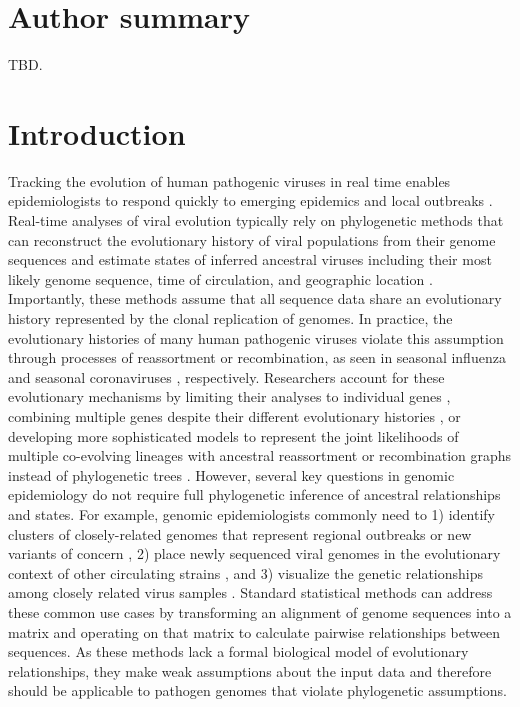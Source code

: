 \documentclass[10pt,letterpaper]{article}
\begin{document}
\section*{Author summary}
TBD.

\linenumbers

\section*{Introduction}

Tracking the evolution of human pathogenic viruses in real time enables epidemiologists to respond quickly to emerging epidemics and local outbreaks \cite{Grubaugh2019}.
Real-time analyses of viral evolution typically rely on phylogenetic methods that can reconstruct the evolutionary history of viral populations from their genome sequences and estimate states of inferred ancestral viruses including their most likely genome sequence, time of circulation, and geographic location \cite{Volz2013,Baele2017,Sagulenko2018}.
Importantly, these methods assume that all sequence data share an evolutionary history represented by the clonal replication of genomes.
In practice, the evolutionary histories of many human pathogenic viruses violate this assumption through processes of reassortment or recombination, as seen in seasonal influenza \cite{Nelson2008,Marshall2013} and seasonal coronaviruses \cite{Su2016}, respectively.
Researchers account for these evolutionary mechanisms by limiting their analyses to individual genes \cite{Lemey2007,Bhatt2011}, combining multiple genes despite their different evolutionary histories \cite{Wiens1998}, or developing more sophisticated models to represent the joint likelihoods of multiple co-evolving lineages with ancestral reassortment or recombination graphs instead of phylogenetic trees \cite{Barrat-Charlaix2022,Muller2022}.
However, several key questions in genomic epidemiology do not require full phylogenetic inference of ancestral relationships and states.
For example, genomic epidemiologists commonly need to 1) identify clusters of closely-related genomes that represent regional outbreaks or new variants of concern \cite{OToole2022,McBroome2022,Stoddard2022}, 2) place newly sequenced viral genomes in the evolutionary context of other circulating strains \cite{OToole2021,Turakhia2021,Aksamentov2021}, and 3) visualize the genetic relationships among closely related virus samples \cite{Argimon2016,Campbell2021}.
Standard statistical methods can address these common use cases by transforming an alignment of genome sequences into a matrix and operating on that matrix to calculate pairwise relationships between sequences.
As these methods lack a formal biological model of evolutionary relationships, they make weak assumptions about the input data and therefore should be applicable to pathogen genomes that violate phylogenetic assumptions.
\end{document}
